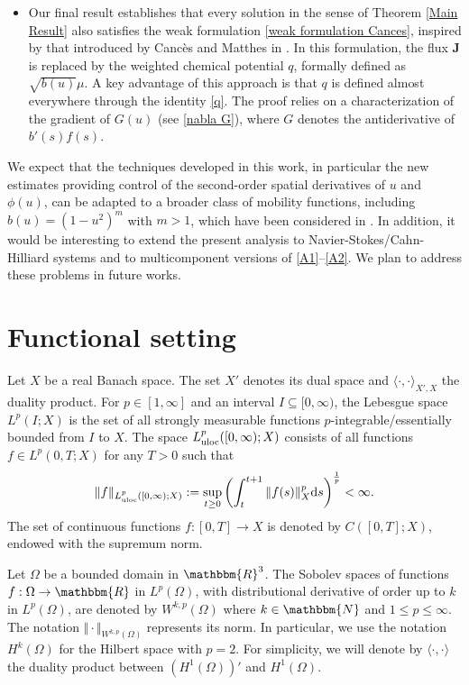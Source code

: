 \documentclass[11pt,  reqno]{amsart}%
\theoremstyle{plain}
\theoremstyle{definition}
\theoremstyle{remark}
\numberwithin{equation}{section}
\newcommand{\ds}{\textup{d}s}
\begin{document}
\begin{itemize}
\item[5.] Our final result establishes that every solution in the sense of Theorem \ref{Main Result} also satisfies the weak formulation \eqref{weak formulation Cances}, inspired by that introduced by Cancès and Matthes in \cite{CM2023}. In this formulation, the flux $\boldsymbol{J}$ is replaced by the weighted chemical potential $q$, formally defined as $\sqrt{b(u)}\mu$. A key advantage of this approach is that $q$ is defined almost everywhere through the identity \eqref{q}.
The proof relies on a characterization of the gradient of $G(u)$ (see \eqref{nabla G}), where $G$ denotes the antiderivative of $b'(s)f(s)$.
\end{itemize}

We expect that the techniques developed in this work, in particular the new estimates providing control of the second-order spatial derivatives of $u$ and $\phi(u)$, can be adapted to a broader class of mobility functions, including $b(u)=(1-u^2)^m$ with $m>1$, which have been considered in \cite{EG1996, LMS2012}. In addition, it would be interesting to extend the present analysis to Navier-Stokes/Cahn-Hilliard systems and to multicomponent versions of \eqref{A1}--\eqref{A2}. We plan to address these problems in future works.

\section{Functional setting}
\label{Func-set}
Let $X$ be a real Banach space. The set $X'$ denotes its dual space and $\langle\cdot, \cdot \rangle_{X',X}$ the duality product. For $p\in[1,\infty]$ and an interval $I \subseteq [0,\infty)$, the Lebesgue space $L^p(I;X)$ is the set of all strongly measurable functions $p$-integrable/essentially bounded from $I$ to $X$. The space $L^p_{\rm uloc}([0,\infty); X)$ consists of all functions $f \in L^p(0,T;X)$ for any $T>0$ such that
$$\|f\|_{L^p_{\rm uloc}([0,\infty); X)}:= \sup_{t\ge 0} \left( \int_t^{t+1} 
\|f(s)\|^p_X \ds \right)^\frac{1}{p} <\infty.$$
The set of continuous functions $f: [0,T]\to X$ is denoted by $C([0,T];X)$, endowed with the supremum norm. 

Let $\Omega $ be a bounded domain in $\mathbbm{R}^{3}$. 
The Sobolev spaces of functions $f:\Omega \rightarrow \mathbbm{R}$ in $L^p(\Omega)$, with distributional derivative of order up to $k$ in $L^p(\Omega)$, are denoted by $W^{k,p}(\Omega )$ where $k\in \mathbbm{N}$ and $1\leq p\leq \infty $. The notation $\Vert \cdot \Vert
_{W^{k,p}(\Omega )}$ represents its norm. In particular, we use the notation $H^k(\Omega)$ for the Hilbert space with $p=2$. For simplicity, we will denote by $\langle\cdot, \cdot \rangle$ the duality product between $(H^1(\Omega))'$ and $H^1(\Omega)$.
\end{document}
